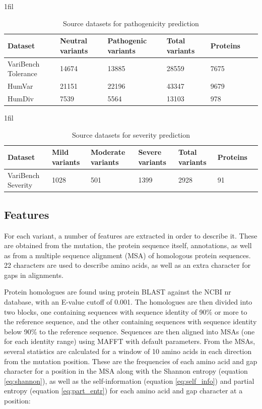 \documentclass[11pt]{article}
\makeatletter
\newcommand*{\centerfloat}{%
  \parindent \z@
  \leftskip \z@ \@plus 1fil \@minus \textwidth
  \rightskip\leftskip
  \parfillskip \z@skip}
\makeatother
\begin{document}
\begin{table}
\caption{Source datasets for pathogenicity prediction}
\label{table:datasets_tolerance}
\begin{center}
\centerfloat
\begin{tabular}{lllllll}
\toprule
Dataset & Neutral variants & Pathogenic variants & Total variants & Proteins \\ 
\midrule
VariBench Tolerance & 14674 & 13885 & 28559 & 7675   \\ 
HumVar & 21151 & 22196 & 43347 & 9679   \\
HumDiv & 7539 & 5564 & 13103 & 978  \\ 
\bottomrule
\end{tabular}
\end{center}
\end{table}

\begin{table}
\caption{Source datasets for severity prediction}
\label{table:dataset_severity}
\begin{center}
\centerfloat
\begin{tabular}{lllllll}
\toprule
Dataset & Mild variants & Moderate variants & Severe variants & Total variants & Proteins \\ 
\midrule
VariBench Severity & 1028 & 501 & 1399 & 2928 & 91   \\ 
\bottomrule
\end{tabular}
\end{center}
\end{table}

\subsection{Features}


For each variant, a number of features are extracted in order to describe it. These are obtained from the mutation, the protein sequence itself, annotations, as well as from a multiple sequence alignment (MSA) of homologous protein sequences. 22 characters are used to describe amino acids, as well as an extra character for gaps in alignments.

Protein homologues are found using protein BLAST against the NCBI nr database, with an E-value cutoff of 0.001. The homologues are then divided into two blocks, one containing sequences with sequence identity of 90\% or more to the reference sequence, and the other containing sequences with sequence identity below 90\% to the reference sequence. Sequences are then aligned into MSAs (one for each identity range) using MAFFT\cite{katoh2013mafft} with default parameters. From the MSAs, several statistics are calculated for a window of 10 amino acids in each direction from the mutation position. These are the frequencies of each amino acid and gap character for a position in the MSA along with the Shannon entropy (equation \ref{eq:shannon}), as well as the self-information (equation \ref{eq:self_info}) and partial entropy (equation \ref{eq:part_entr}) for each amino acid and gap character at a position:
\end{document}
